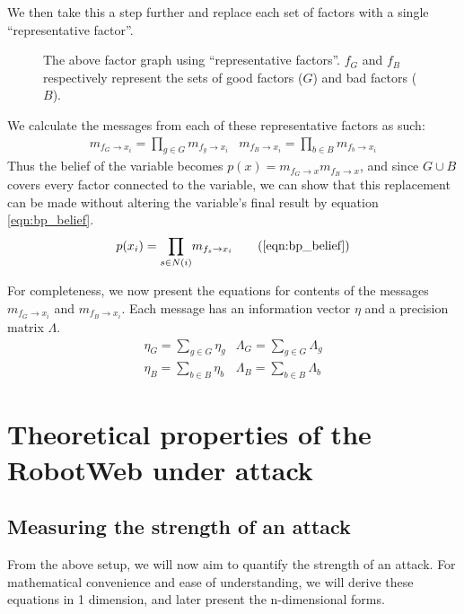 We then take this a step further and replace each set of factors with a single ``representative factor''.
\begin{figure}[!h]
	\centering
	

	\caption[Representative factor graph around a single variable]{The above factor graph using ``representative factors''. $f_G$ and $f_B$ respectively represent the sets of good factors ($G$) and bad factors ($B$).}
\end{figure}

We calculate the messages from each of these representative factors as such:
\begin{eqnarray}
	m_{f_G \rightarrow x_i} = \underset{g \in G}{\prod} m_{f_g \rightarrow x_i}&
	m_{f_B \rightarrow x_i} = \underset{b \in B}{\prod} m_{f_b \rightarrow x_i}
\end{eqnarray}
Thus the belief of the variable becomes $p(x) = m_{f_G \rightarrow x} m_{f_B \rightarrow x}$, and since $G \cup B$ covers every factor connected to the variable, we can show that this replacement can be made without altering the variable's final result by equation \ref{eqn:bp_belief}.
\begin{equation}
	p(x_i) = \underset{s \in N(i)}{\prod} m_{f_s \rightarrow x_i}
	\tag{\ref{eqn:bp_belief}}
\end{equation}

For completeness, we now present the equations for contents of the messages $m_{f_G \rightarrow x_i}$ and $m_{f_B \rightarrow x_i}$. 
Each message has an information vector $\eta$ and a precision matrix $\Lambda$.
\begin{eqnarray}
	\eta_G = \underset{g \in G}{\sum} \eta_g&
	\Lambda_G = \underset{g \in G}{\sum} \Lambda_g \label{eqn:good_pull}\\
	\eta_B = \underset{b \in B}{\sum} \eta_b&
	\Lambda_B = \underset{b \in B}{\sum} \Lambda_b \label{eqn:bad_pull}
\end{eqnarray}

\section{Theoretical properties of the RobotWeb under attack}
\subsection{Measuring the strength of an attack}
From the above setup, we will now aim to quantify the strength of an attack. For mathematical convenience and ease of understanding, we will derive these equations in 1 dimension, and later present the n-dimensional forms.

